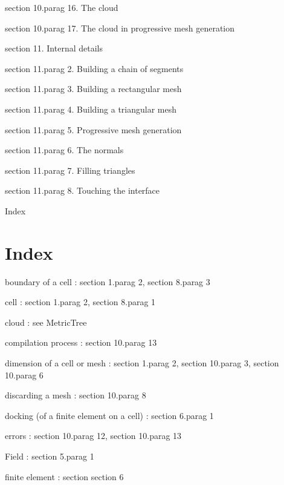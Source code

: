 \numb section 10.\numb parag 16. The cloud

\numb section 10.\numb parag 17. The cloud in progressive mesh generation


\medskip\noindent
\numb section 11. Internal details

\numb section 11.\numb parag 2. Building a chain of segments

\numb section 11.\numb parag 3. Building a rectangular mesh

\numb section 11.\numb parag 4. Building a triangular mesh

\numb section 11.\numb parag 5. Progressive mesh generation

\numb section 11.\numb parag 6. The normals

\numb section 11.\numb parag 7. Filling triangles

\numb section 11.\numb parag 8. Touching the interface

\medskip\noindent
Index


 
% 
% 
% 
% 
% 
% 
% 
% 
% 
% 



\section{Index}

boundary of a cell : \numb section 1.\numb parag 2, \numb section 8.\numb parag 3

cell : \numb section 1.\numb parag 2, \numb section 8.\numb parag 1

cloud : see {\codett MetricTree}

compilation process : \numb section 10.\numb parag 13

dimension of a cell or mesh : \numb section 1.\numb parag 2, \numb section 10.\numb parag 3,
\numb section 10.\numb parag 6

discarding a mesh : \numb section 10.\numb parag 8

docking (of a finite element on a cell) : \numb section 6.\numb parag 1

errors : \numb section 10.\numb parag 12, \numb section 10.\numb parag 13

{\codett Field} : \numb section 5.\numb parag 1

finite element : section \numb section 6

